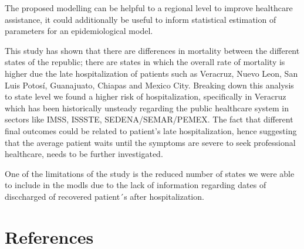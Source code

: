 \documentclass[10pt,letterpaper]{article}
\begin{document}
The proposed modelling can be helpful to a regional level to improve
healthcare assistance, it could additionally be useful to inform
statistical estimation of parameters for an epidemiological model.

This study has shown that there are differences in mortality between the
different states of the republic; there are states in which the overall
rate of mortality is higher due the late hospitalization of patients
such as Veracruz, Nuevo Leon, San Luis Potosí, Guanajuato, Chiapas and
Mexico City. Breaking down this analysis to state level we found a
higher risk of hospitalization, specifically in Veracruz which has been
historically unsteady regarding the public healthcare system in sectors
like IMSS, ISSSTE, SEDENA/SEMAR/PEMEX. The fact that different final
outcomes could be related to patient's late hospitalization, hence
suggesting that the average patient waits until the symptoms are severe
to seek professional healthcare, needs to be further investigated.

One of the limitations of the study is the reduced number of states we
were able to include in the modls due to the lack of information
regarding dates of disccharged of recovered patient´s after
hospitalization.

\hypertarget{references}{%
\section*{References}\label{references}}
\end{document}
